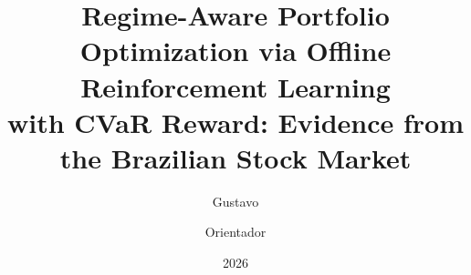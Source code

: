 \documentclass[12pt,a4paper]{article}
\begin{document}
\title{Regime-Aware Portfolio Optimization via Offline Reinforcement Learning\\
with CVaR Reward: Evidence from the Brazilian Stock Market}

\author{Gustavo \and Orientador}

\date{2026}

\maketitle












\end{document}
